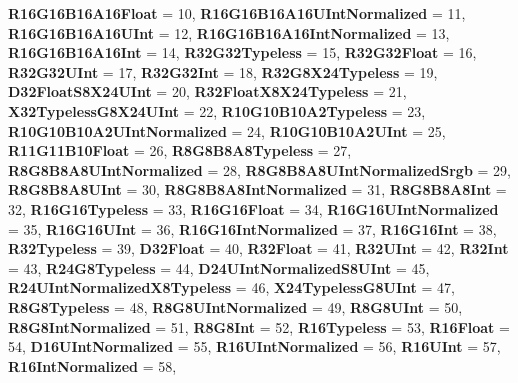 \begin{DoxyCompactItemize}
{\bfseries R16\+G16\+B16\+A16\+Float} = 10, 
{\bfseries R16\+G16\+B16\+A16\+U\+Int\+Normalized} = 11, 
{\bfseries R16\+G16\+B16\+A16\+U\+Int} = 12, 
{\bfseries R16\+G16\+B16\+A16\+Int\+Normalized} = 13, 
\newline
{\bfseries R16\+G16\+B16\+A16\+Int} = 14, 
{\bfseries R32\+G32\+Typeless} = 15, 
{\bfseries R32\+G32\+Float} = 16, 
{\bfseries R32\+G32\+U\+Int} = 17, 
\newline
{\bfseries R32\+G32\+Int} = 18, 
{\bfseries R32\+G8\+X24\+Typeless} = 19, 
{\bfseries D32\+Float\+S8\+X24\+U\+Int} = 20, 
{\bfseries R32\+Float\+X8\+X24\+Typeless} = 21, 
\newline
{\bfseries X32\+Typeless\+G8\+X24\+U\+Int} = 22, 
{\bfseries R10\+G10\+B10\+A2\+Typeless} = 23, 
{\bfseries R10\+G10\+B10\+A2\+U\+Int\+Normalized} = 24, 
{\bfseries R10\+G10\+B10\+A2\+U\+Int} = 25, 
\newline
{\bfseries R11\+G11\+B10\+Float} = 26, 
{\bfseries R8\+G8\+B8\+A8\+Typeless} = 27, 
{\bfseries R8\+G8\+B8\+A8\+U\+Int\+Normalized} = 28, 
{\bfseries R8\+G8\+B8\+A8\+U\+Int\+Normalized\+Srgb} = 29, 
\newline
{\bfseries R8\+G8\+B8\+A8\+U\+Int} = 30, 
{\bfseries R8\+G8\+B8\+A8\+Int\+Normalized} = 31, 
{\bfseries R8\+G8\+B8\+A8\+Int} = 32, 
{\bfseries R16\+G16\+Typeless} = 33, 
\newline
{\bfseries R16\+G16\+Float} = 34, 
{\bfseries R16\+G16\+U\+Int\+Normalized} = 35, 
{\bfseries R16\+G16\+U\+Int} = 36, 
{\bfseries R16\+G16\+Int\+Normalized} = 37, 
\newline
{\bfseries R16\+G16\+Int} = 38, 
{\bfseries R32\+Typeless} = 39, 
{\bfseries D32\+Float} = 40, 
{\bfseries R32\+Float} = 41, 
\newline
{\bfseries R32\+U\+Int} = 42, 
{\bfseries R32\+Int} = 43, 
{\bfseries R24\+G8\+Typeless} = 44, 
{\bfseries D24\+U\+Int\+Normalized\+S8\+U\+Int} = 45, 
\newline
{\bfseries R24\+U\+Int\+Normalized\+X8\+Typeless} = 46, 
{\bfseries X24\+Typeless\+G8\+U\+Int} = 47, 
{\bfseries R8\+G8\+Typeless} = 48, 
{\bfseries R8\+G8\+U\+Int\+Normalized} = 49, 
\newline
{\bfseries R8\+G8\+U\+Int} = 50, 
{\bfseries R8\+G8\+Int\+Normalized} = 51, 
{\bfseries R8\+G8\+Int} = 52, 
{\bfseries R16\+Typeless} = 53, 
\newline
{\bfseries R16\+Float} = 54, 
{\bfseries D16\+U\+Int\+Normalized} = 55, 
{\bfseries R16\+U\+Int\+Normalized} = 56, 
{\bfseries R16\+U\+Int} = 57, 
\newline
{\bfseries R16\+Int\+Normalized} = 58, 

\end{DoxyCompactItemize}
